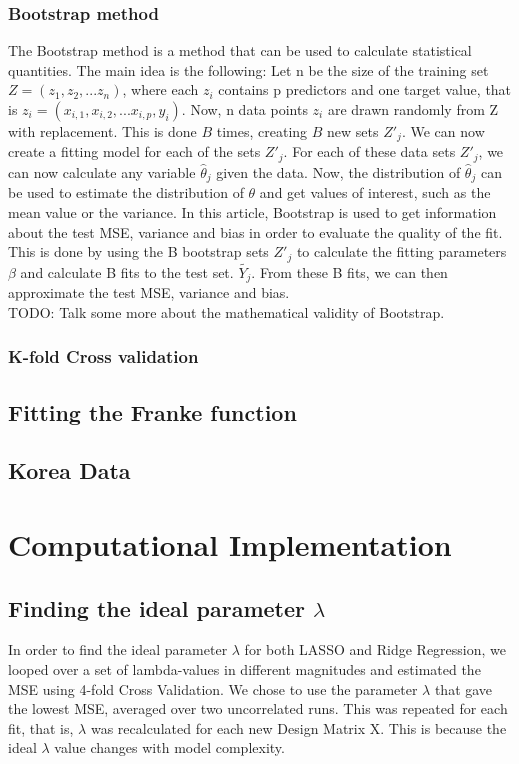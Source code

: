 \documentclass[11pt,a4paper]{article}
\begin{document}
\subsubsection{Bootstrap method}
The Bootstrap method is a method that can be used to calculate statistical quantities. The main idea is the following: Let n be the size of the training set $Z=(z_1,z_2,...z_n)$, where each $z_i$ contains p predictors and one target value, that is $z_i=(x_{i,1},x_{i,2},...x_{i,p},y_i)$. Now, n data points $z_i$ are drawn randomly from Z with replacement. This is done $B$ times, creating $B$ new sets $Z'_j$. We can now create a fitting model for each of the sets  $Z'_j$. For each of these data sets $Z'_j$, we can now calculate any variable $\hat\theta_j$ given the data. Now, the distribution of $\hat\theta_j$ can be used to estimate the distribution of $\theta$ and get values of interest, such as the mean value or the variance. In this article, Bootstrap is used to get information about the test MSE, variance and bias in order to evaluate the quality of the fit. This is done by using the B bootstrap sets $Z'_j$ to calculate the fitting parameters $\beta$ and calculate B fits to the test set. $\tilde{Y_j}$. From these B fits, we can then approximate the test MSE, variance and bias.\\
TODO: Talk some more about the mathematical validity of Bootstrap.
\subsubsection{K-fold Cross validation}
\subsection{Fitting the Franke function}
\subsection{Korea Data}
\section{Computational Implementation}
\subsection{Finding the ideal parameter $\lambda$}
In order to find the ideal parameter $\lambda$ for both LASSO and Ridge Regression, we looped over a set of lambda-values in different magnitudes and estimated the MSE using 4-fold Cross Validation. We chose to use the parameter $\lambda$ that gave the lowest MSE, averaged over two uncorrelated runs. This was repeated for each fit, that is,  $\lambda$ was recalculated for each new Design Matrix X. This is because the ideal $\lambda$ value changes with model complexity.
\end{document}

